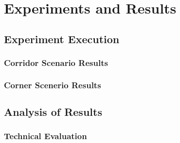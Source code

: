 
\chapter{Experiments and Results} %

\label{Chapter5} %


\section{Experiment Execution}



\subsection{Corridor Scenario Results}




\subsection{Corner Scenerio Results}



\section{Analysis of Results}



\subsection{Technical Evaluation}


